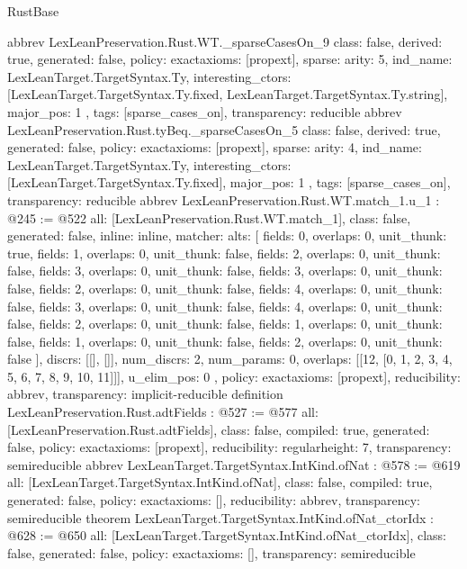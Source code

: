 \begin{lexlean}{RustBase}
\begin{coremodule}
{}
abbrev LexLeanPreservation.Rust.WT._sparseCasesOn_9 {
  class: false,
  derived: true,
  generated: false,
  policy: exact{axioms: [propext]},
  sparse: {
    arity: 5,
    ind_name: LexLeanTarget.TargetSyntax.Ty,
    interesting_ctors: [LexLeanTarget.TargetSyntax.Ty.fixed, LexLeanTarget.TargetSyntax.Ty.string],
    major_pos: 1
  },
  tags: [sparse_cases_on],
  transparency: reducible
}
abbrev LexLeanPreservation.Rust.tyBeq._sparseCasesOn_5 {
  class: false,
  derived: true,
  generated: false,
  policy: exact{axioms: [propext]},
  sparse: {
    arity: 4,
    ind_name: LexLeanTarget.TargetSyntax.Ty,
    interesting_ctors: [LexLeanTarget.TargetSyntax.Ty.fixed],
    major_pos: 1
  },
  tags: [sparse_cases_on],
  transparency: reducible
}
abbrev LexLeanPreservation.Rust.WT.match_1.{u_1} : @245 := @522 {
  all: [LexLeanPreservation.Rust.WT.match_1],
  class: false,
  generated: false,
  inline: inline,
  matcher: {
    alts: [
      {fields: 0, overlaps: 0, unit_thunk: true},
      {fields: 1, overlaps: 0, unit_thunk: false},
      {fields: 2, overlaps: 0, unit_thunk: false},
      {fields: 3, overlaps: 0, unit_thunk: false},
      {fields: 3, overlaps: 0, unit_thunk: false},
      {fields: 2, overlaps: 0, unit_thunk: false},
      {fields: 4, overlaps: 0, unit_thunk: false},
      {fields: 3, overlaps: 0, unit_thunk: false},
      {fields: 4, overlaps: 0, unit_thunk: false},
      {fields: 2, overlaps: 0, unit_thunk: false},
      {fields: 1, overlaps: 0, unit_thunk: false},
      {fields: 1, overlaps: 0, unit_thunk: false},
      {fields: 2, overlaps: 0, unit_thunk: false}
    ],
    discrs: [[], []],
    num_discrs: 2,
    num_params: 0,
    overlaps: [[12, [0, 1, 2, 3, 4, 5, 6, 7, 8, 9, 10, 11]]],
    u_elim_pos: 0
  },
  policy: exact{axioms: [propext]},
  reducibility: abbrev{},
  transparency: implicit-reducible
}
definition LexLeanPreservation.Rust.adtFields : @527 := @577 {
  all: [LexLeanPreservation.Rust.adtFields],
  class: false,
  compiled: true,
  generated: false,
  policy: exact{axioms: [propext]},
  reducibility: regular{height: 7},
  transparency: semireducible
}
abbrev LexLeanTarget.TargetSyntax.IntKind.ofNat : @578 := @619 {
  all: [LexLeanTarget.TargetSyntax.IntKind.ofNat],
  class: false,
  compiled: true,
  generated: false,
  policy: exact{axioms: []},
  reducibility: abbrev{},
  transparency: semireducible
}
theorem LexLeanTarget.TargetSyntax.IntKind.ofNat_ctorIdx : @628 := @650 {
  all: [LexLeanTarget.TargetSyntax.IntKind.ofNat_ctorIdx],
  class: false,
  generated: false,
  policy: exact{axioms: []},
  transparency: semireducible
}
\end{coremodule}
\end{lexlean}
